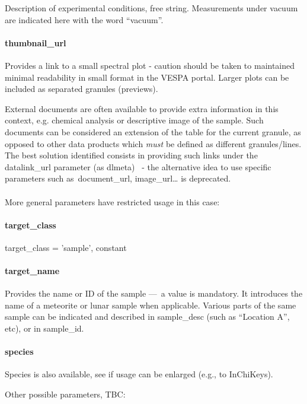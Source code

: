 \documentclass[11pt,a4paper]{ivoa}
\begin{document}
Description of experimental conditions, free string. Measurements under vacuum are indicated here with the word ``vacuum''.

\paragraph{thumbnail\_url}

Provides a link to a small spectral plot - caution should be taken to maintained minimal readability in small format in the VESPA portal. Larger plots can be included as separated granules (previews).

External documents are often available to provide extra information in this context, e.g. chemical analysis or descriptive image of the sample. Such documents can be considered an extension of the table for the current granule, as opposed to other data products which \emph{must} be defined as different granules/lines. The best solution identified consists in providing such links under the datalink\_url parameter (as dlmeta)  - the alternative idea to use specific parameters such as document\_url, image\_url… is deprecated.\\\\

More general parameters have restricted usage in this case:

\paragraph{target\_class\textbf{ }}

target\_class = 'sample', constant

\paragraph{target\_name}

Provides the name or ID of the sample — a value is mandatory. It introduces the name of a meteorite or lunar sample when applicable. Various parts of the same sample can be indicated and described in sample\_desc (such as ``Location A'', etc), or in sample\_id.

\paragraph{species}

Species is also available, see if usage can be enlarged (e.g., to InChiKeys).

Other possible parameters, TBC:
\end{document}
